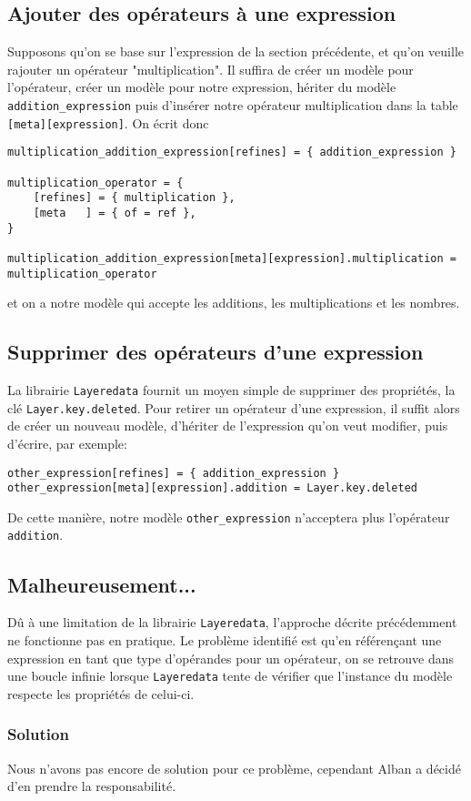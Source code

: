 \documentclass{article}
\begin{document}
\subsection{Ajouter des opérateurs à une expression}
Supposons qu'on se base sur l'expression de la section précédente, et qu'on veuille rajouter un opérateur "multiplication". Il suffira de créer un modèle pour l'opérateur, créer un modèle pour notre expression, hériter du modèle \lstinline|addition_expression| puis d'insérer notre opérateur multiplication dans la table \lstinline|[meta][expression]|. On écrit donc
\begin{verbatim}
multiplication_addition_expression[refines] = { addition_expression }

multiplication_operator = {
	[refines] = { multiplication },
	[meta   ] = { of = ref },
}

multiplication_addition_expression[meta][expression].multiplication = multiplication_operator
\end{verbatim}
et on a notre modèle qui accepte les additions, les multiplications et les nombres.
\subsection{Supprimer des opérateurs d'une expression}
La librairie \lstinline|Layeredata| fournit un moyen simple de supprimer des propriétés, la clé \lstinline|Layer.key.deleted|. Pour retirer un opérateur d'une expression, il suffit alors de créer un nouveau modèle, d'hériter de l'expression qu'on veut modifier, puis d'écrire, par exemple:
\begin{verbatim}
other_expression[refines] = { addition_expression }
other_expression[meta][expression].addition = Layer.key.deleted
\end{verbatim}
De cette manière, notre modèle \lstinline|other_expression| n'acceptera plus l'opérateur \lstinline|addition|.
\subsection{Malheureusement...}
Dû à une limitation de la librairie \lstinline|Layeredata|, l'approche décrite précédemment ne fonctionne pas en pratique. Le problème identifié est qu'en référençant une expression en tant que type d'opérandes pour un opérateur, on se retrouve dans une boucle infinie lorsque \lstinline|Layeredata| tente de vérifier que l'instance du modèle respecte les propriétés de celui-ci.
\subsubsection{Solution}
Nous n'avons pas encore de solution pour ce problème, cependant Alban a décidé d'en prendre la responsabilité.
\end{document}
